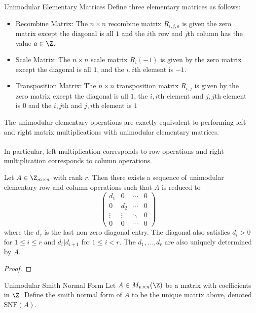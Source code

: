 \documentclass[a4paper]{article}
\begin{document}
\begin{defn}{Unimodular Elementary Matrices}{} Define three elementary matrices as follows: 
\begin{itemize}
\item Recombine Matrix: The $n\times n$ recombine matrix $R_{i,j,a}$ is given the zero matrix except the diagonal is all $1$ and the $i$th row and $j$th column has the value $a\in\Z$. 
\item Scale Matrix: The $n\times n$ scale matrix $R_{i}(-1)$ is given by  the zero matrix except the diagonal is all $1$, and the $i,i$th element is $-1$. 
\item Transposition Matrix: The $n\times n$ transposition matrix $R_{i,j}$ is given by the zero matrix except the diagonal is all $1$, the $i,i$th element and $j,j$th element is $0$ and the $i,j$th and $j,i$th element is $1$
\end{itemize}
\end{defn}

\begin{prp}{}{} The unimodular elementary operations are exactly equivalent to performing left and right matrix multiplications with unimodular elementary matrices. \\~\\
In particular, left multiplication corresponds to row operations and right multiplication corresponds to column operations. 
\end{prp}

\begin{thm}{}{} Let $A\in\Z_{m\times n}$ with rank $r$. Then there exists a sequence of unimodular elementary row and column operations such that $A$ is reduced to $$\begin{pmatrix}
d_1 & 0 & \cdots & 0\\
0 & d_2 & \cdots & 0\\
\vdots & \vdots & \ddots & 0\\
0 & 0 & \cdots & 0
\end{pmatrix}$$ where the $d_r$ is the last non zero diagonal entry. The diagonal also satisfies $d_i>0$ for $1\leq i\leq r$ and $d_i|d_{i+1}$ for $1\leq i<r$. The $d_1,\dots,d_r$ are also uniquely determined by $A$. \tcbline
\begin{proof}
\end{proof}
\end{thm}

\begin{defn}{Unimodular Smith Normal Form}{} Let $A\in M_{n\times n}(\Z)$ be a matrix with coefficients in $\Z$. Define the smith normal form of $A$ to be the unique matrix above, denoted $\text{SNF}(A)$. 
\end{defn}
\end{document}
